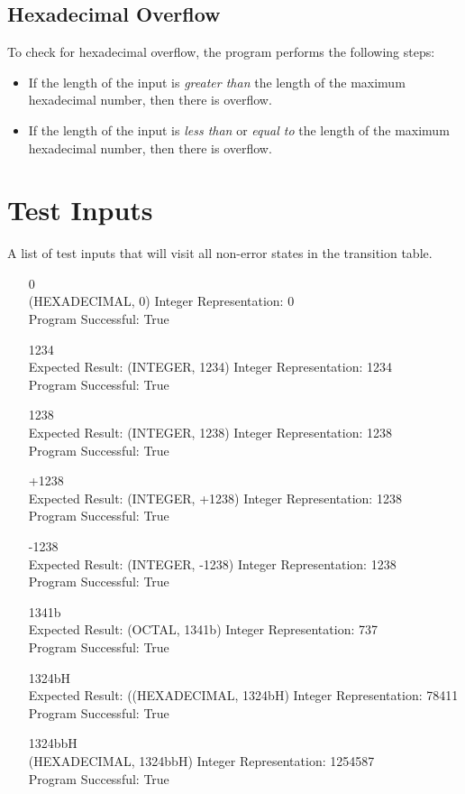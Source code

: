 \documentclass[11pt]{article}
\begin{document}
\subsection{Hexadecimal Overflow}
To check for hexadecimal overflow, the program performs the following steps:
\begin{itemize}
\item If the length of the input is \textit{greater than} the length of the maximum hexadecimal number, then there is overflow.
\item If the length of the input is \textit{less than} or \textit{equal to} the length of the maximum hexadecimal number, then there is overflow.
\end{itemize}

\newpage
\section{Test Inputs}
A list of test inputs that will visit all non-error states in the transition table.
\begin{itemize}
\item[0] \hfill \\
(HEXADECIMAL, 0) Integer Representation: 0\\
Program Successful: True
\item[1234] \hfill \\
Expected Result: (INTEGER, 1234) Integer Representation: 1234\\
Program Successful: True
\item[1238] \hfill \\
Expected Result: (INTEGER, 1238) Integer Representation: 1238\\
Program Successful: True
\item[+1238] \hfill \\
Expected Result: (INTEGER, +1238) Integer Representation: 1238\\
Program Successful: True
\item[-1238] \hfill \\
Expected Result: (INTEGER, -1238) Integer Representation: 1238\\
Program Successful: True
\item[1341b] \hfill \\
Expected Result: (OCTAL, 1341b) Integer Representation: 737\\
Program Successful: True
\item[1324bH] \hfill \\
Expected Result: ((HEXADECIMAL, 1324bH) Integer Representation: 78411\\
Program Successful: True
\item[1324bbH] \hfill \\
(HEXADECIMAL, 1324bbH) Integer Representation: 1254587\\
Program Successful: True
\end{itemize}
\end{document}
